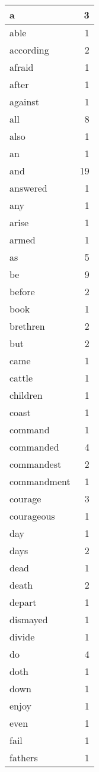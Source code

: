 \begin{center}
\begin{longtable}{l|r}
a & 3 \\ \hline
able & 1 \\ \hline
according & 2 \\ \hline
afraid & 1 \\ \hline
after & 1 \\ \hline
against & 1 \\ \hline
all & 8 \\ \hline
also & 1 \\ \hline
an & 1 \\ \hline
and & 19 \\ \hline
answered & 1 \\ \hline
any & 1 \\ \hline
arise & 1 \\ \hline
armed & 1 \\ \hline
as & 5 \\ \hline
be & 9 \\ \hline
before & 2 \\ \hline
book & 1 \\ \hline
brethren & 2 \\ \hline
but & 2 \\ \hline
came & 1 \\ \hline
cattle & 1 \\ \hline
children & 1 \\ \hline
coast & 1 \\ \hline
command & 1 \\ \hline
commanded & 4 \\ \hline
commandest & 2 \\ \hline
commandment & 1 \\ \hline
courage & 3 \\ \hline
courageous & 1 \\ \hline
day & 1 \\ \hline
days & 2 \\ \hline
dead & 1 \\ \hline
death & 2 \\ \hline
depart & 1 \\ \hline
dismayed & 1 \\ \hline
divide & 1 \\ \hline
do & 4 \\ \hline
doth & 1 \\ \hline
down & 1 \\ \hline
enjoy & 1 \\ \hline
even & 1 \\ \hline
fail & 1 \\ \hline
fathers & 1 \\ \hline

\end{longtable}
\end{center}
